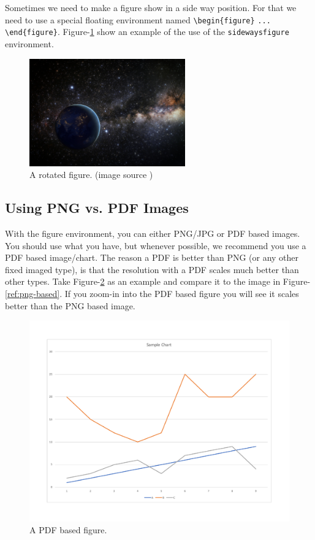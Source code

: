 Sometimes we need to make a figure show in a side way position. For that we need to use a special floating environment named  \verb|\begin{figure}| \verb|...| \verb|\end{figure}|. Figure-\ref{fig:rotated-figure} show an example of the use of the \verb|sidewaysfigure| environment. 

\clearpage
\begin{figure}
    \begin{center}
    \includegraphics[width=0.6\textwidth]{figures/samples/earth-in-space.jpg}
    \caption{A rotated figure. (image source \cite{pdp:23})}
    \label{fig:rotated-figure}
    \end{center}
\end{figure}
\clearpage

\subsection{Using PNG vs. PDF Images}

With the figure environment, you can either PNG/JPG or PDF based images. You should use what you have, but whenever possible, we recommend you use a PDF based image/chart. The reason a PDF is better than PNG (or any other fixed imaged type), is that the resolution with a PDF scales much better than other types. Take Figure-\ref{ref:pdf-based} as an example and compare it to the image in Figure-\ref{ref:png-based}. If you zoom-in into the PDF based figure you will see it scales better than the PNG based image. 


\begin{figure}[H]
    \begin{center}
        \includegraphics[width=0.5\linewidth]{figures/samples/pdf-sample.pdf}
        \caption{A PDF based figure.}
        \label{ref:pdf-based}
    \end{center}
\end{figure}

